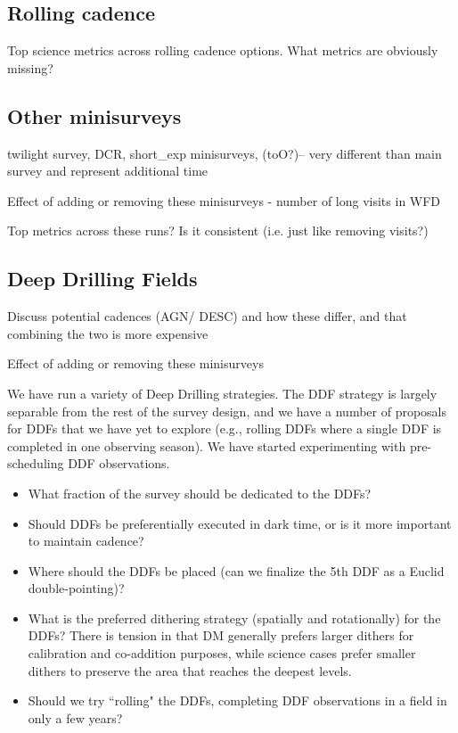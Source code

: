 \subsection{Rolling cadence}

Top science metrics across rolling cadence options. 
What metrics are obviously missing?


\subsection{Other minisurveys}

twilight survey, DCR, short\_exp minisurveys, (toO?)-- very different than main survey and represent additional time

Effect of adding or removing these minisurveys - number of long visits in WFD



Top metrics across these runs? Is it consistent (i.e. just like removing visits?)


\subsection{Deep Drilling Fields}


Discuss potential cadences (AGN/ DESC) and how these differ, and that combining the two is more expensive

Effect of adding or removing these minisurveys

We have run a variety of Deep Drilling strategies. The DDF strategy is largely separable from the rest of the survey design, and we have a number of proposals for DDFs that we have yet to explore (e.g., rolling DDFs where a single DDF is completed in one observing season).  We have started experimenting with pre-scheduling DDF observations. 

\begin{itemize}
    \item{What fraction of the survey should be dedicated to the DDFs?}
    \item{Should DDFs be preferentially executed in dark time, or is it more important to maintain cadence?}
    \item{Where should the DDFs be placed (can we finalize the 5th DDF as a Euclid double-pointing)?}
    \item{What is the preferred dithering strategy (spatially and rotationally) for the DDFs? There is tension in that DM generally prefers larger dithers for calibration and co-addition purposes, while science cases prefer smaller dithers to preserve the area that reaches the deepest levels.}
    \item{Should we try ``rolling" the DDFs, completing DDF observations in a field in only a few years?}
\end{itemize}

